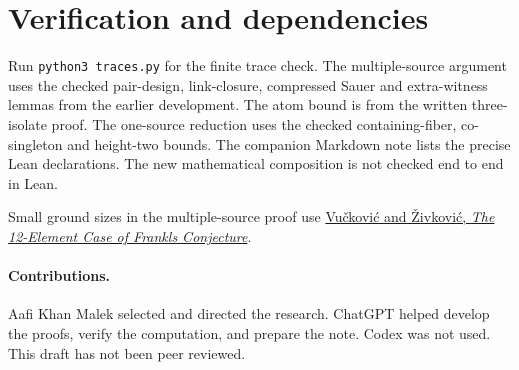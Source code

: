 \documentclass[11pt,letterpaper]{article}
\begin{document}
\section{Verification and
dependencies}\label{verification-and-dependencies}

Run \texttt{python3 traces.py} for the finite trace check. The
multiple-source argument uses the checked pair-design, link-closure,
compressed Sauer and extra-witness lemmas from the earlier development.
The atom bound is from the written three-isolate proof. The one-source
reduction uses the checked containing-fiber, co-singleton and height-two
bounds. The companion Markdown note lists the precise Lean declarations.
The new mathematical composition is not checked end to end in Lean.

Small ground sizes in the multiple-source proof use
\href{https://ipsitransactions.org/journals/papers/tir/2017jan/fullPaper.pdf}{Vučković
and Živković, \emph{The 12-Element Case of Frankl\textquotesingle s
Conjecture}}.
\paragraph{Contributions.}
Aafi Khan Malek selected and directed the research. ChatGPT helped
develop the proofs, verify the computation, and prepare the note.
Codex was not used. This draft has not been peer reviewed.
\end{document}
